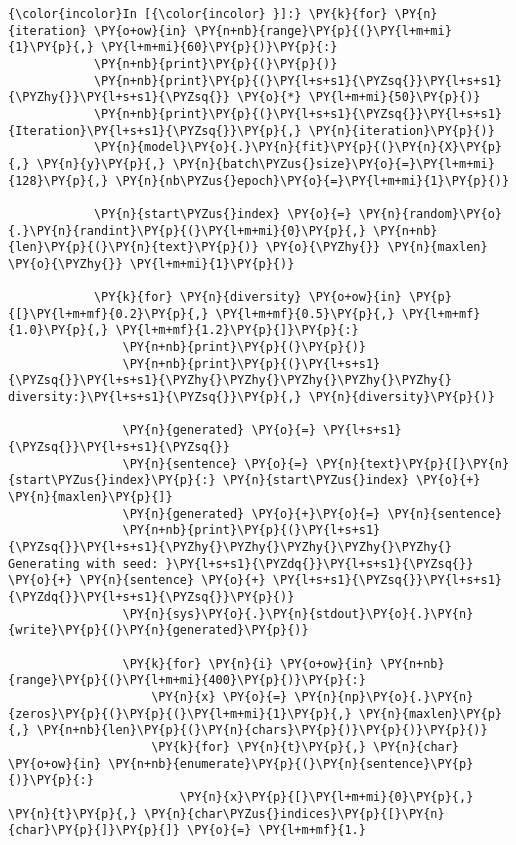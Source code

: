     \begin{Verbatim}[commandchars=\\\{\}]
{\color{incolor}In [{\color{incolor} }]:} \PY{k}{for} \PY{n}{iteration} \PY{o+ow}{in} \PY{n+nb}{range}\PY{p}{(}\PY{l+m+mi}{1}\PY{p}{,} \PY{l+m+mi}{60}\PY{p}{)}\PY{p}{:}
            \PY{n+nb}{print}\PY{p}{(}\PY{p}{)}
            \PY{n+nb}{print}\PY{p}{(}\PY{l+s+s1}{\PYZsq{}}\PY{l+s+s1}{\PYZhy{}}\PY{l+s+s1}{\PYZsq{}} \PY{o}{*} \PY{l+m+mi}{50}\PY{p}{)}
            \PY{n+nb}{print}\PY{p}{(}\PY{l+s+s1}{\PYZsq{}}\PY{l+s+s1}{Iteration}\PY{l+s+s1}{\PYZsq{}}\PY{p}{,} \PY{n}{iteration}\PY{p}{)}
            \PY{n}{model}\PY{o}{.}\PY{n}{fit}\PY{p}{(}\PY{n}{X}\PY{p}{,} \PY{n}{y}\PY{p}{,} \PY{n}{batch\PYZus{}size}\PY{o}{=}\PY{l+m+mi}{128}\PY{p}{,} \PY{n}{nb\PYZus{}epoch}\PY{o}{=}\PY{l+m+mi}{1}\PY{p}{)}
        
            \PY{n}{start\PYZus{}index} \PY{o}{=} \PY{n}{random}\PY{o}{.}\PY{n}{randint}\PY{p}{(}\PY{l+m+mi}{0}\PY{p}{,} \PY{n+nb}{len}\PY{p}{(}\PY{n}{text}\PY{p}{)} \PY{o}{\PYZhy{}} \PY{n}{maxlen} \PY{o}{\PYZhy{}} \PY{l+m+mi}{1}\PY{p}{)}
        
            \PY{k}{for} \PY{n}{diversity} \PY{o+ow}{in} \PY{p}{[}\PY{l+m+mf}{0.2}\PY{p}{,} \PY{l+m+mf}{0.5}\PY{p}{,} \PY{l+m+mf}{1.0}\PY{p}{,} \PY{l+m+mf}{1.2}\PY{p}{]}\PY{p}{:}
                \PY{n+nb}{print}\PY{p}{(}\PY{p}{)}
                \PY{n+nb}{print}\PY{p}{(}\PY{l+s+s1}{\PYZsq{}}\PY{l+s+s1}{\PYZhy{}\PYZhy{}\PYZhy{}\PYZhy{}\PYZhy{} diversity:}\PY{l+s+s1}{\PYZsq{}}\PY{p}{,} \PY{n}{diversity}\PY{p}{)}
        
                \PY{n}{generated} \PY{o}{=} \PY{l+s+s1}{\PYZsq{}}\PY{l+s+s1}{\PYZsq{}}
                \PY{n}{sentence} \PY{o}{=} \PY{n}{text}\PY{p}{[}\PY{n}{start\PYZus{}index}\PY{p}{:} \PY{n}{start\PYZus{}index} \PY{o}{+} \PY{n}{maxlen}\PY{p}{]}
                \PY{n}{generated} \PY{o}{+}\PY{o}{=} \PY{n}{sentence}
                \PY{n+nb}{print}\PY{p}{(}\PY{l+s+s1}{\PYZsq{}}\PY{l+s+s1}{\PYZhy{}\PYZhy{}\PYZhy{}\PYZhy{}\PYZhy{} Generating with seed: }\PY{l+s+s1}{\PYZdq{}}\PY{l+s+s1}{\PYZsq{}} \PY{o}{+} \PY{n}{sentence} \PY{o}{+} \PY{l+s+s1}{\PYZsq{}}\PY{l+s+s1}{\PYZdq{}}\PY{l+s+s1}{\PYZsq{}}\PY{p}{)}
                \PY{n}{sys}\PY{o}{.}\PY{n}{stdout}\PY{o}{.}\PY{n}{write}\PY{p}{(}\PY{n}{generated}\PY{p}{)}
        
                \PY{k}{for} \PY{n}{i} \PY{o+ow}{in} \PY{n+nb}{range}\PY{p}{(}\PY{l+m+mi}{400}\PY{p}{)}\PY{p}{:}
                    \PY{n}{x} \PY{o}{=} \PY{n}{np}\PY{o}{.}\PY{n}{zeros}\PY{p}{(}\PY{p}{(}\PY{l+m+mi}{1}\PY{p}{,} \PY{n}{maxlen}\PY{p}{,} \PY{n+nb}{len}\PY{p}{(}\PY{n}{chars}\PY{p}{)}\PY{p}{)}\PY{p}{)}
                    \PY{k}{for} \PY{n}{t}\PY{p}{,} \PY{n}{char} \PY{o+ow}{in} \PY{n+nb}{enumerate}\PY{p}{(}\PY{n}{sentence}\PY{p}{)}\PY{p}{:}
                        \PY{n}{x}\PY{p}{[}\PY{l+m+mi}{0}\PY{p}{,} \PY{n}{t}\PY{p}{,} \PY{n}{char\PYZus{}indices}\PY{p}{[}\PY{n}{char}\PY{p}{]}\PY{p}{]} \PY{o}{=} \PY{l+m+mf}{1.}
        

\end{Verbatim}
